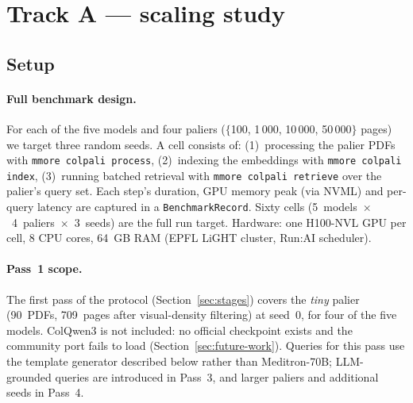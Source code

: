 \documentclass[10pt,a4paper]{article}
\begin{document}
\section{Track A --- scaling study}
\subsection{Setup}

\paragraph{Full benchmark design.}
For each of the five models and four paliers ($\{$100, 1\,000, 10\,000,
50\,000$\}$ pages) we target three random seeds. A cell consists of:
(1)~processing the palier PDFs with \texttt{mmore colpali process},
(2)~indexing the embeddings with \texttt{mmore colpali index},
(3)~running batched retrieval with \texttt{mmore colpali retrieve} over the
palier's query set. Each step's duration, GPU memory peak (via
\textsc{NVML}) and per-query latency are captured in a
\texttt{BenchmarkRecord}. Sixty cells
(5~models~$\times$~4~paliers~$\times$~3~seeds) are the full run target.
Hardware: one H100-NVL GPU per cell, 8 CPU cores, 64~GB RAM (EPFL LiGHT
cluster, Run:AI scheduler).

\paragraph{Pass~1 scope.}
\label{sec:pass1}
The first pass of the protocol (Section~\ref{sec:stages}) covers the
\emph{tiny} palier (90~PDFs, 709~pages after visual-density filtering) at
seed~0, for four of the five models. ColQwen3 is not included: no official
checkpoint exists and the community port fails to load
(Section~\ref{sec:future-work}). Queries for this pass use the template
generator described below rather than Meditron-70B; LLM-grounded queries are
introduced in Pass~3, and larger paliers and additional seeds in Pass~4.
\end{document}
